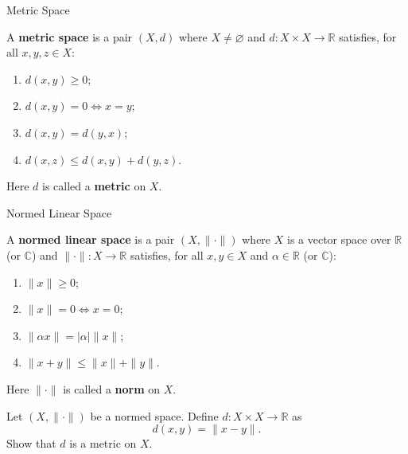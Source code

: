 \documentclass[12pt, a4paper]{article}
\begin{document}
\FrontPage
\Large

\begin{heading}
    Metric Space
\end{heading}

\vspace{10pt}

\begin{definition}
    A \textbf{metric space} is a pair $(X,d)$ where $X\neq\varnothing$ and
    $d:X\times X\to\mathbb{R}$ satisfies, for all $x,y,z\in X$:
    \begin{enumerate}[label=(M\arabic*)]
    \item $d(x,y)\ge 0$;
    \item $d(x,y)=0 \iff x=y$;
    \item $d(x,y)=d(y,x)$;
    \item $d(x,z)\le d(x,y)+d(y,z)$.
    \end{enumerate}
    Here $d$ is called a \textbf{metric} on $X$.
\end{definition}

\clearpage

\begin{heading}
    Normed Linear Space
\end{heading}

\vspace{10pt}

\begin{definition}
    A \textbf{normed linear space} is a pair $(X,\|\cdot\|)$ where $X$ is a vector space
    over $\mathbb{R}$ (or $\mathbb{C}$) and
    $\|\cdot\|:X\to\mathbb{R}$ satisfies, for all $x,y\in X$ and $\alpha\in\mathbb{R}$
    (or $\mathbb{C}$):
    \begin{enumerate}[label=(N\arabic*)]
    \item $\|x\|\ge 0$;
    \item $\|x\|=0 \iff x=0$;
    \item $\|\alpha x\|=|\alpha|\|x\|$;
    \item $\|x+y\|\le \|x\|+\|y\|$.
    \end{enumerate}
    Here $\|\cdot\|$ is called a \textbf{norm} on $X$.
\end{definition}

\vspace{100pt}

\begin{theorem}
    Let $(X,\|\cdot\|)$ be a normed space. Define $d:X\times X\to\mathbb{R}$ as
    \[
        d(x,y)=\|x-y\|.
    \]
    Show that $d$ is a metric on $X$.
\end{theorem}
\end{document}
